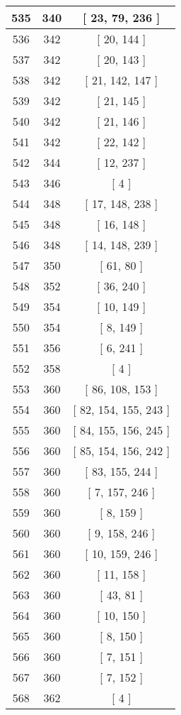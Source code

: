 \begin{center}
\begin{longtable}[H]{|| c c c ||}
\hline
535 & 340 & [ 23, 79, 236 ] \\ 
\hline
536 & 342 & [ 20, 144 ] \\ 
\hline
537 & 342 & [ 20, 143 ] \\ 
\hline
538 & 342 & [ 21, 142, 147 ] \\ 
\hline
539 & 342 & [ 21, 145 ] \\ 
\hline
540 & 342 & [ 21, 146 ] \\ 
\hline
541 & 342 & [ 22, 142 ] \\ 
\hline
542 & 344 & [ 12, 237 ] \\ 
\hline
543 & 346 & [ 4 ] \\ 
\hline
544 & 348 & [ 17, 148, 238 ] \\ 
\hline
545 & 348 & [ 16, 148 ] \\ 
\hline
546 & 348 & [ 14, 148, 239 ] \\ 
\hline
547 & 350 & [ 61, 80 ] \\ 
\hline
548 & 352 & [ 36, 240 ] \\ 
\hline
549 & 354 & [ 10, 149 ] \\ 
\hline
550 & 354 & [ 8, 149 ] \\ 
\hline
551 & 356 & [ 6, 241 ] \\ 
\hline
552 & 358 & [ 4 ] \\ 
\hline
553 & 360 & [ 86, 108, 153 ] \\ 
\hline
554 & 360 & [ 82, 154, 155, 243 ] \\ 
\hline
555 & 360 & [ 84, 155, 156, 245 ] \\ 
\hline
556 & 360 & [ 85, 154, 156, 242 ] \\ 
\hline
557 & 360 & [ 83, 155, 244 ] \\ 
\hline
558 & 360 & [ 7, 157, 246 ] \\ 
\hline
559 & 360 & [ 8, 159 ] \\ 
\hline
560 & 360 & [ 9, 158, 246 ] \\ 
\hline
561 & 360 & [ 10, 159, 246 ] \\ 
\hline
562 & 360 & [ 11, 158 ] \\ 
\hline
563 & 360 & [ 43, 81 ] \\ 
\hline
564 & 360 & [ 10, 150 ] \\ 
\hline
565 & 360 & [ 8, 150 ] \\ 
\hline
566 & 360 & [ 7, 151 ] \\ 
\hline
567 & 360 & [ 7, 152 ] \\ 
\hline
568 & 362 & [ 4 ] \\ 
\hline

\end{longtable}
\end{center}

